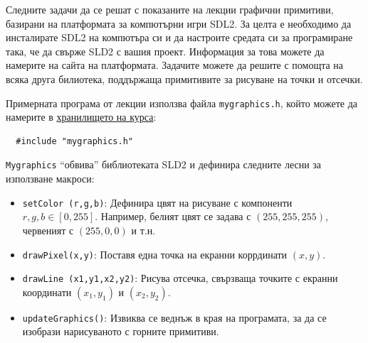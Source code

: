 \documentclass[12pt,a4paper]{article}
\newcommand{\code}[1]{\texttt{#1}}
\begin{document}
{  \begin{mdframed}[hidealllines=true,backgroundcolor=gray!20]

  Следните задачи да се решат с показаните на лекции графични примитиви, базирани на платформата за компютърни игри SDL2. За целта е необходимо да инсталирате SDL2 на компютъра си и да настроите средата си за програмиране така, че да свърже SLD2 с вашия проект. Информация за това можете да намерите на сайта на платформата.
	Задачите можете да решите с помощта на всяка друга билиотека, поддържаща примитивите за рисуване на точки и отсечки.

  Примерната програма от лекции използва файла \code{mygraphics.h}, който можете да намерите в \href{https://github.com/stranxter/lecture-notes/tree/master/samples/01_programming%20101/2018/pixels}{\underline{хранилището на курса}}:
  \begin{mdframed}[hidealllines=true,backgroundcolor=lightgray!20]
  \begin{verbatim}
  #include "mygraphics.h"
  \end{verbatim}
  \end{mdframed}

  \code{Mygraphics} ``обвива'' библиотеката SLD2 и дефинира следните лесни за използване макроси:

  \begin{itemize}
    \item \code{setColor (r,g,b)}: Дефинира цвят на рисуване с компоненти $r,g,b\in[0,255]$. Например, белият цвят се задава с $(255,255,255)$, червеният с $(255,0,0)$ и т.н.
    \item \code{drawPixel(x,y)}: Поставя една точка на екранни коррдинати $(x,y)$.
    \item \code{drawLine (x1,y1,x2,y2)}: Рисува отсечка, свързваща точките с екранни координати $(x_1,y_1)$ и $(x_2,y_2)$.
    \item \code{updateGraphics()}: Извиква се веднъж в края на програмата, за да се изобрази нарисуваното с горните примитиви.
  \end{itemize}
\end{mdframed}

}
\end{document}
